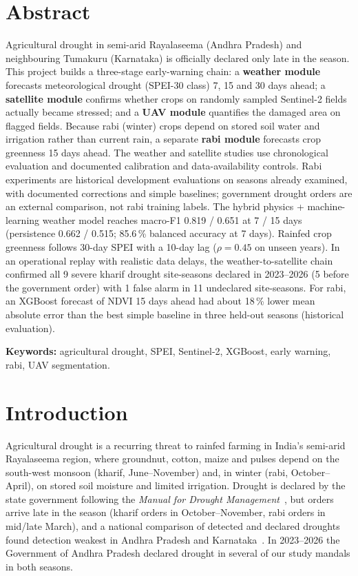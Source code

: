 \documentclass[11pt,a4paper,oneside]{article}
\newcommand{\mf}{macro-F1}
\begin{document}
\section*{Abstract}
Agricultural drought in semi-arid Rayalaseema (Andhra Pradesh) and neighbouring Tumakuru (Karnataka) is officially declared only late in the season. This project builds a three-stage early-warning chain: a \textbf{weather module} forecasts meteorological drought (SPEI-30 class) 7, 15 and 30 days ahead; a \textbf{satellite module} confirms whether crops on randomly sampled Sentinel-2 fields actually became stressed; and a \textbf{UAV module} quantifies the damaged area on flagged fields. Because rabi (winter) crops depend on stored soil water and irrigation rather than current rain, a separate \textbf{rabi module} forecasts crop greenness 15 days ahead.
The weather and satellite studies use chronological evaluation and documented calibration and data-availability controls. Rabi experiments are historical development evaluations on seasons already examined, with documented corrections and simple baselines; government drought orders are an external comparison, not rabi training labels.
The hybrid physics + machine-learning weather model reaches \mf{} 0.819 / 0.651 at 7 / 15 days (persistence 0.662 / 0.515; 85.6\,\% balanced accuracy at 7 days). Rainfed crop greenness follows 30-day SPEI with a 10-day lag ($\rho = 0.45$ on unseen years). In an operational replay with realistic data delays, the weather-to-satellite chain confirmed all 9 severe kharif drought site-seasons declared in 2023--2026 (5 before the government order) with 1 false alarm in 11 undeclared site-seasons. For rabi, an XGBoost forecast of NDVI 15 days ahead had about 18\,\% lower mean absolute error than the best simple baseline in three held-out seasons (historical evaluation).

\vspace{4pt}
\textbf{Keywords:} agricultural drought, SPEI, Sentinel-2, XGBoost, early warning, rabi, UAV segmentation.

\section{Introduction}

Agricultural drought is a recurring threat to rainfed farming in India's semi-arid Rayalaseema region, where groundnut, cotton, maize and pulses depend on the south-west monsoon (kharif, June--November) and, in winter (rabi, October--April), on stored soil moisture and limited irrigation. Drought is declared by the state government following the \textit{Manual for Drought Management}~\cite{manual2016}, but orders arrive late in the season (kharif orders in October--November, rabi orders in mid/late March), and a national comparison of detected and declared droughts found detection weakest in Andhra Pradesh and Karnataka~\cite{bhardwaj2021}. In 2023--2026 the Government of Andhra Pradesh declared drought in several of our study mandals in both seasons.
\end{document}

